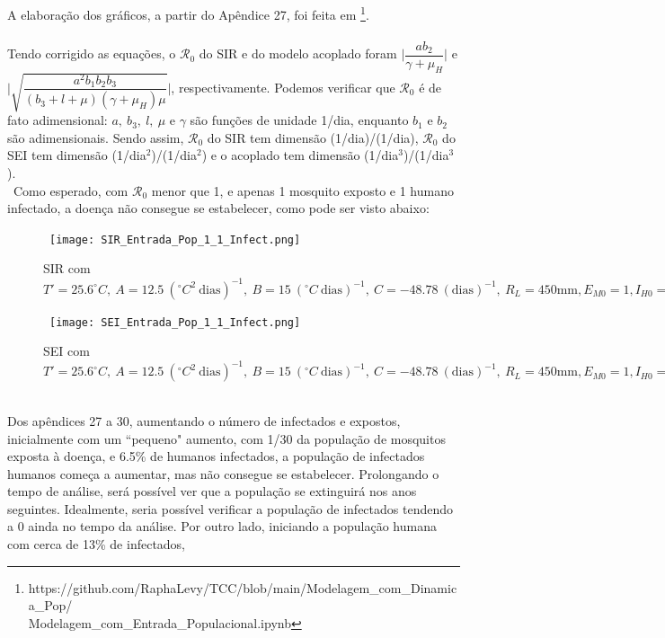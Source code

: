 A elaboração dos gráficos, a partir do Apêndice 27, foi feita em \footnote{https://github.com/RaphaLevy/TCC/blob/main/Modelagem\_com\_Dinamica\_Pop/ \\
Modelagem\_com\_Entrada\_Populacional.ipynb}.
\\\\
Tendo corrigido as equações, o $\mathcal{R}_0$ do SIR e do modelo acoplado 
foram $\Big | \dfrac{ab_2}{\gamma + \mu_H}\Big | $ e 
$\Big | \sqrt{\dfrac{a^2b_1b_2b_3}{(b_3+l+\mu)(\gamma+\mu_H)\mu}}\Big | $, respectivamente. Podemos verificar que $\mathcal{R}_0$ é de fato adimensional: $a, \ b_3, \ l, \ \mu$ e $\gamma$ são funções de unidade 1/dia, enquanto $b_1$ e $b_2$ são adimensionais. Sendo assim, $\mathcal{R}_0$ do SIR tem dimensão (1/dia)/(1/dia), $\mathcal{R}_0$ do SEI tem dimensão (1/dia$^2$)/(1/dia$^2$) e o acoplado tem dimensão (1/dia$^3$)/(1/dia$^3$). 
\\\
Como esperado, com $\mathcal{R}_0$ menor que 1, e apenas 1 mosquito exposto e 
1 humano infectado, a doença não consegue se estabelecer, como pode ser visto abaixo:
\begin{figure}[!ht]
        \centering
        \hbox{\hspace{2.5em} \texttt{[image: SIR\_Entrada\_Pop\_1\_1\_Infect.png]}}
        \caption{SIR com $T'=25.6 ^\circ C, \ A=12.5 \ (^\circ C^2 \ \text{dias})^{-1}, \ B=15 \ (^\circ C \ \text{dias})^{-1}, \ C=-48.78 \ (\text{dias})^{-1}, \ R_L=450 \text{mm}, E_{M0}=1, I_{H0}=1$} 
\end{figure} 
\begin{figure}[!ht]
        \centering
        \hbox{\hspace{2.5em} \texttt{[image: SEI\_Entrada\_Pop\_1\_1\_Infect.png]}}
        \caption{SEI com $T'=25.6 ^\circ C, \ A=12.5 \ (^\circ C^2 \ \text{dias})^{-1}, \ B=15 \ (^\circ C \ \text{dias})^{-1}, \ C=-48.78 \ (\text{dias})^{-1}, \ R_L=450 \text{mm}, E_{M0}=1, I_{H0}=1$} 
\end{figure} 
\\Dos apêndices 27 a 30, aumentando o número de infectados e expostos, inicialmente com um 
``pequeno" aumento, com 1/30 da população de mosquitos exposta à doença, e 6.5\% 
de humanos infectados, a população de infectados humanos começa a aumentar, 
mas não consegue se estabelecer. Prolongando o tempo de análise, será possível 
ver que a população se extinguirá nos anos seguintes. Idealmente, seria 
possível verificar a população de infectados tendendo a 0 ainda no tempo da 
análise. Por outro lado, iniciando a população humana com cerca de 13\% de infectados, 
